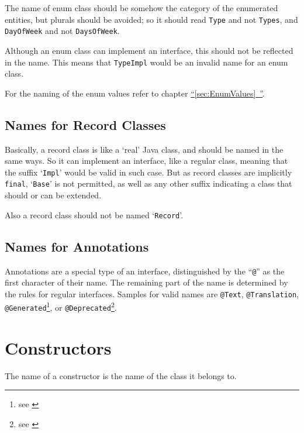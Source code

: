 \documentclass[11pt,a4paper, titlepage, parskip=half, headsepline, footsepline, cleardoublepage=current, headheight=1cm]{scrbook}
\newcommand*{\tqfullref}[1]{\hyperref[{#1}]{“\ref*{#1}~\nameref*{#1}”}}
\begin{document}
The name of enum class should be somehow the category of the enumerated entities, but plurals should be avoided; so it should read \lstinline|Type| and not \lstinline|Types|, and \lstinline|DayOfWeek| and not \lstinline|DaysOfWeek|.

Although an enum class can implement an interface, this should not be reflected in the name. This means that \lstinline|TypeImpl| would be an invalid name for an enum class.

For the naming of the enum values refer to chapter \tqfullref{sec:EnumValues}.


\subsection{Names for Record Classes}\label{sec:NamesForRecordClasses}
Basically, a record class is like a ‘real’ Java class, and should be named in the same ways. So it can implement an interface, like a regular class, meaning that the suffix ‘\verb#Impl#’ would be valid in such case. But as record classes are implicitly \lstinline|final|, ‘\verb#Base#’ is not permitted, as well as any other suffix indicating a class that should or can be extended.

Also a record class should not be named ‘\verb#Record#’.


\subsection{Names for Annotations}\label{sec:NamesForAnnotations}
Annotations are a special type of an interface, distinguished by the “\verb#@#” as the first character of their name. The remaining part of the name is determined by the rules for regular interfaces. Samples for valid names are \lstinline|@Text|, \lstinline|@Translation|, \lstinline|@Generated|\footnote{see \autocite{ORACLE_DOC_GENERATED_ANNOTATION}}, or \lstinline|@Deprecated|\footnote{see \autocite{ORACLE_DOC_DEPRECATED_ANNOTATION}}.


\section{Constructors}\label{sec:NamesForConstructors}
The name of a constructor is the name of the class it belongs to.
\end{document}
